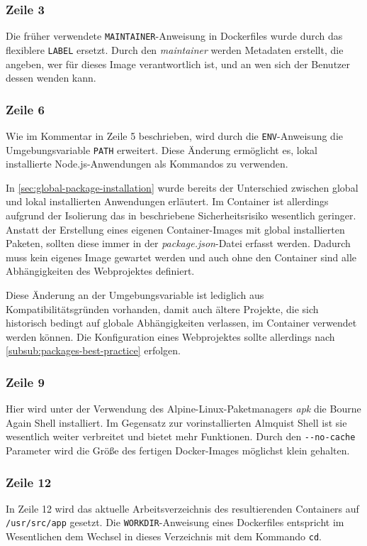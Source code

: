 \subsubsection{Zeile 3}
Die früher verwendete \verb|MAINTAINER|-Anweisung in Dockerfiles wurde durch das flexiblere \verb|LABEL| ersetzt.
Durch den \emph{maintainer} werden Metadaten erstellt, die angeben, wer für dieses Image verantwortlich ist, und an wen sich der Benutzer dessen wenden kann.

\subsubsection{Zeile 6}
Wie im Kommentar in Zeile 5 beschrieben, wird durch die \verb|ENV|-Anweisung die Umgebungsvariable \verb|PATH| erweitert.
Diese Änderung ermöglicht es, lokal installierte Node.js-Anwendungen als Kommandos zu verwenden.

In \cref{sec:global-package-installation} wurde bereits der Unterschied zwischen global und lokal installierten Anwendungen erläutert.
Im Container ist allerdings aufgrund der Isolierung das in \autocite{stackoverflow:nodemodules-hack:online} beschriebene Sicherheitsrisiko wesentlich geringer.
Anstatt der Erstellung eines eigenen Container-Images mit global installierten Paketen, sollten diese immer in der \emph{package.json}-Datei erfasst werden.
Dadurch muss kein eigenes Image gewartet werden und auch ohne den Container sind alle Abhängigkeiten des Webprojektes definiert.

Diese Änderung an der Umgebungsvariable ist lediglich aus Kompatibilitätsgründen vorhanden, damit auch ältere Projekte, die sich historisch bedingt auf globale Abhängigkeiten verlassen, im Container verwendet werden können.
Die Konfiguration eines Webprojektes sollte allerdings nach \cref{subsub:packages-best-practice} erfolgen.

\subsubsection{Zeile 9}
Hier wird unter der Verwendung des Alpine-Linux-Paketmanagers \emph{apk} die Bourne Again Shell installiert.
Im Gegensatz zur vorinstallierten Almquist Shell ist sie wesentlich weiter verbreitet und bietet mehr Funktionen.
Durch den \verb|--no-cache| Parameter wird die Größe des fertigen Docker-Images möglichst klein gehalten.

\subsubsection{Zeile 12}
In Zeile 12 wird das aktuelle Arbeitsverzeichnis des resultierenden Containers auf \verb|/usr/src/app| gesetzt.
Die \verb|WORKDIR|-Anweisung eines Dockerfiles entspricht im Wesentlichen dem Wechsel in dieses Verzeichnis mit dem Kommando \verb|cd|.

